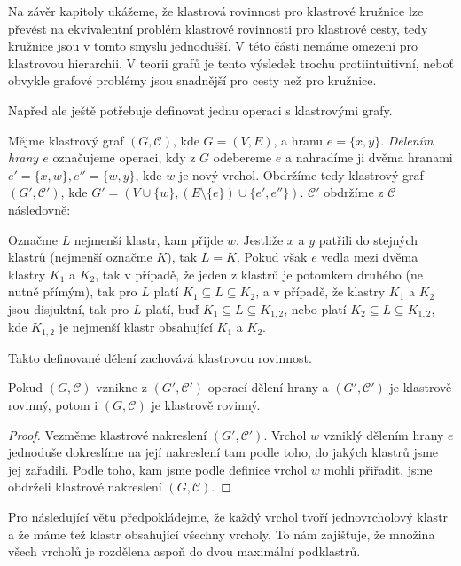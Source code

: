 Na závěr kapitoly ukážeme, že klastrová rovinnost pro klastrové kružnice lze převést na ekvivalentní problém klastrové rovinnosti pro klastrové cesty, tedy kružnice jsou v tomto smyslu jednodušší. V této části nemáme omezení pro klastrovou hierarchii. V teorii grafů je tento výsledek trochu protiintuitivní, neboť obvykle grafové problémy jsou snadnější pro cesty než pro kružnice. 

Napřed ale ještě potřebuje definovat jednu operaci s klastrovými grafy.

\begin{defn}Mějme klastrový graf $(G, \mathcal C)$, kde $G=(V,E)$, a hranu $e=\{x,y\}$. \textit{Dělením hrany $e$} označujeme operaci, kdy z $G$ odebereme $e$ a nahradíme ji dvěma hranami $e'=\{x,w\}, e''=\{w,y\}$, kde $w$ je nový vrchol. Obdržíme tedy klastrový graf $(G', \mathcal C')$, kde $G'=(V \cup \{w\},(E \setminus \{e\}) \cup \{e',e''\})$. $\mathcal C'$ obdržíme z $\mathcal C$ následovně:

Označme $L$ nejmenší klastr, kam přijde $w$. Jestliže $x$ a $y$ patřili do stejných klastrů (nejmenší označme $K$), tak $L=K$. Pokud však $e$ vedla mezi dvěma klastry $K_1$ a $K_2$, tak v případě, že jeden z klastrů je potomkem druhého (ne nutně přímým), tak pro $L$ platí $K_1 \subseteq L \subseteq K_2$, a v případě, že klastry $K_1$ a $K_2$ jsou disjuktní, tak pro $L$ platí, buď $K_1 \subseteq L \subseteq K_{1,2}$, nebo platí $K_2 \subseteq L \subseteq K_{1,2}$, kde $K_{1,2}$ je nejmenší klastr obsahující $K_1$ a $K_2$.
\end{defn}

Takto definované dělení zachovává klastrovou rovinnost.

\begin{lemma}
Pokud $(G, \mathcal C)$ vznikne z $(G', \mathcal C')$ operací dělení hrany a $(G', \mathcal C')$ je klastrově rovinný, potom i $(G, \mathcal C)$ je klastrově rovinný.
\end{lemma}
\begin{proof}
Vezměme klastrové nakreslení $(G', \mathcal C')$. Vrchol $w$ vzniklý dělením hrany $e$ jednoduše dokreslíme na její nakreslení tam podle toho, do jakých klastrů jsme jej zařadili. Podle toho, kam jsme podle definice vrchol $w$ mohli přiřadit, jsme obdrželi klastrové nakreslení $(G, \mathcal C)$.
\end{proof}

Pro následující větu předpokládejme, že každý vrchol tvoří jednovrcholový klastr a že máme tež klastr obsahující všechny vrcholy. To nám zajišťuje, že množina všech vrcholů je rozdělena aspoň do dvou maximální podklastrů.

